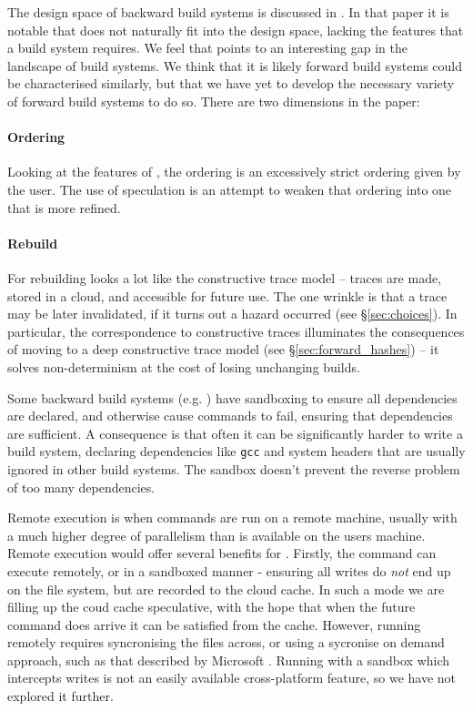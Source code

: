 The design space of backward build systems is discussed in \cite{build_systems_a_la_carte}. In that paper it is notable that \Fabricate does not naturally fit into the design space, lacking the features that a build system requires. We feel that points to an interesting gap in the landscape of build systems. We think that it is likely forward build systems could be characterised similarly, but that we have yet to develop the necessary variety of forward build systems to do so. There are two dimensions in the paper:

\paragraph{Ordering} Looking at the features of \Rattle, the ordering is an excessively strict ordering given by the user. The use of speculation is an attempt to weaken that ordering into one that is more refined.

\paragraph{Rebuild} For rebuilding \Rattle looks a lot like the constructive trace model -- traces are made, stored in a cloud, and accessible for future use. The one wrinkle is that a trace may be later invalidated, if it turns out a hazard occurred (see \S\ref{sec:choices}). In particular, the correspondence to constructive traces illuminates the consequences of moving to a deep constructive trace model (see \S\ref{sec:forward_hashes}) -- it solves non-determinism at the cost of losing unchanging builds.

\postparagraphs

Some backward build systems (e.g. \Bazel \cite{bazel}) have sandboxing to ensure all dependencies are declared, and otherwise cause commands to fail, ensuring that dependencies are sufficient. A consequence is that often it can be significantly harder to write a \Bazel build system, declaring dependencies like \texttt{gcc} and system headers that are usually ignored in other build systems. The sandbox doesn't prevent the reverse problem of too many dependencies.

Remote execution is when commands are run on a remote machine, usually with a much higher degree of parallelism than is available on the users machine. Remote execution would offer several benefits for \Rattle. Firstly, the command can execute remotely, or in a sandboxed manner - ensuring all writes do \emph{not} end up on the file system, but are recorded to the cloud cache. In such a mode we are filling up the coud cache speculative, with the hope that when the future command does arrive it can be satisfied from the cache. However, running remotely requires syncronising the files across, or using a sycronise on demand approach, such as that described by Microsoft \cite{}. Running with a sandbox which intercepts writes is not an easily available cross-platform feature, so we have not explored it further.

